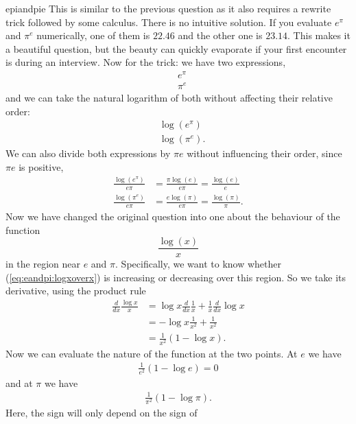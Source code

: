 \begin{answer}{epiandpie}
This is similar to the previous question as it also requires a rewrite trick followed by some calculus.
There is no intuitive solution.
If you evaluate
$e^\pi$
and
$\pi^e$
numerically, one of them is
$22.46$
and the other one is
$23.14$.
This makes it a beautiful question, but the beauty can quickly evaporate if your first encounter is during an interview.
Now for the trick: we have two expressions,
\begin{align*}
&
e^\pi
\\
&
\pi^e
\end{align*}
and we can take the natural logarithm of both without affecting their relative order:
\begin{align*}
&
\log(e^\pi)
\\
&
\log(\pi^e)
\text{.}
\end{align*}
We can also divide both expressions by $\pi e$ without influencing their order, since $\pi e$ is positive,
\begin{align*}
\frac{\log(e^\pi)}{e \pi}
&=
\frac{\pi\log(e)}{e \pi}
=
\frac{\log(e)}{e}
\\
\frac{\log(\pi^e)}{e \pi}
&=
\frac{e \log(\pi)}{e \pi}
=
\frac{\log(\pi)}{\pi}
\text{.}
\end{align*}
Now we have changed the original question into one about the behaviour of the function
\begin{equation}
\label{eq:eandpi:logxoverx}
\frac{\log(x)}{x}
\end{equation}
in the region near $e$ and $\pi$.
Specifically, we want to know whether (\ref{eq:eandpi:logxoverx}) is increasing or decreasing over this region.
So we take its derivative, using the product rule
\begin{align*}
\frac{d}{dx}
\frac{\log{x}}{x}
 &=
\log x
\frac{d}{dx}
\frac{1}{x}
+
\frac{1}{x}
\frac{d}{dx}
\log{x}
\\
 &=
 -
\log x
\frac{1}{x^2}
+
\frac{1}{x^2}
\\
 &=
\frac{1}{x^2}
\left(
1 - \log x
\right)
\text{.}
\end{align*}
Now we can evaluate the nature of the function at the two points.
At $e$ we have
\begin{align*}
\frac{1}{e^2}
\left(
1 - \log e
\right)
=0
\end{align*}
and at $\pi$ we have
\begin{align*}
\frac{1}{\pi^2}
\left(
1 - \log \pi
\right)
\text{.}
\end{align*}
Here, the sign will only depend on the sign of

\end{answer}

